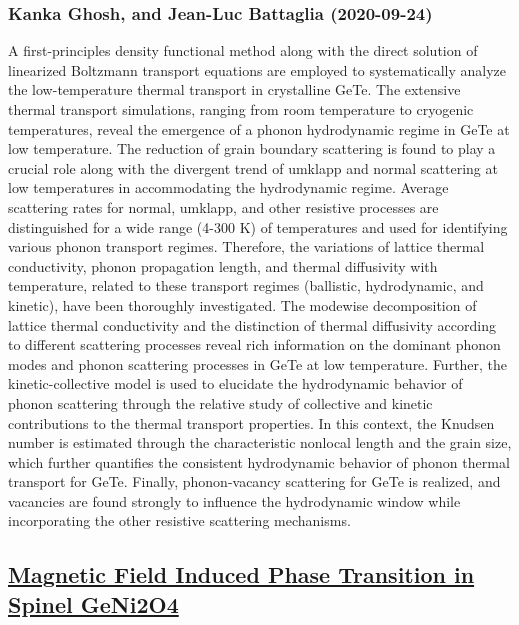 \subsubsection*{Kanka Ghosh, and Jean-Luc Battaglia (2020-09-24)}
A first-principles density functional method along with the direct solution
of linearized Boltzmann transport equations are employed to systematically
analyze the low-temperature thermal transport in crystalline GeTe. The
extensive thermal transport simulations, ranging from room temperature to
cryogenic temperatures, reveal the emergence of a phonon hydrodynamic regime in
GeTe at low temperature. The reduction of grain boundary scattering is found to
play a crucial role along with the divergent trend of umklapp and normal
scattering at low temperatures in accommodating the hydrodynamic regime.
Average scattering rates for normal, umklapp, and other resistive processes are
distinguished for a wide range (4-300 K) of temperatures and used for
identifying various phonon transport regimes. Therefore, the variations of
lattice thermal conductivity, phonon propagation length, and thermal
diffusivity with temperature, related to these transport regimes (ballistic,
hydrodynamic, and kinetic), have been thoroughly investigated. The modewise
decomposition of lattice thermal conductivity and the distinction of thermal
diffusivity according to different scattering processes reveal rich information
on the dominant phonon modes and phonon scattering processes in GeTe at low
temperature. Further, the kinetic-collective model is used to elucidate the
hydrodynamic behavior of phonon scattering through the relative study of
collective and kinetic contributions to the thermal transport properties. In
this context, the Knudsen number is estimated through the characteristic
nonlocal length and the grain size, which further quantifies the consistent
hydrodynamic behavior of phonon thermal transport for GeTe. Finally,
phonon-vacancy scattering for GeTe is realized, and vacancies are found
strongly to influence the hydrodynamic window while incorporating the other
resistive scattering mechanisms.

\subsection*{\href{http://arxiv.org/abs/2009.11960v1}{Magnetic Field Induced Phase Transition in Spinel GeNi2O4}}
